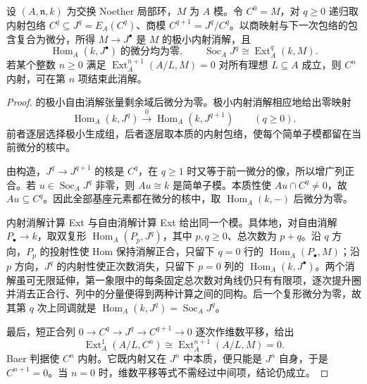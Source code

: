 \begin{lemma}\label{b3:lem:minimal-injective-resolution-socle}
	设 \((A,\mathfrak n,k)\) 为交换 Noether 局部环，\(M\) 为 \(A\) 模。令 \(C^0=M\)，对 \(q\ge0\) 递归取内射包络 \(C^q\subseteq J^q=E_A(C^q)\)、商模 \(C^{q+1}=J^q/C^q\)。以商映射与下一次包络的包含复合为微分，所得 \(M\to J^\bullet\) 是 \(M\) 的极小内射消解，且
	\[
		\operatorname{Hom}_A(k,J^\bullet)\;\text{的微分均为零}, \qquad \operatorname{Soc}_A J^q\cong\operatorname{Ext}_A^q(k,M).
	\]
	若某个整数 \(n\ge0\) 满足 \(\operatorname{Ext}_A^{n+1}(A/L,M)=0\) 对所有理想 \(L\subseteq A\) 成立，则 \(C^n\) 内射，可在第 \(n\) 项结束此消解。
\end{lemma}
\begin{proof}
	的极小自由消解张量剩余域后微分为零。极小内射消解相应地给出零映射
	\[
		\operatorname{Hom}_A(k,J^q)\xrightarrow{0} \operatorname{Hom}_A(k,J^{q+1})\qquad(q\ge0).
	\]
	前者逐层选择极小生成组，后者逐层取本质的内射包络，使每个简单子模都留在当前微分的核中。

	由构造，\(J^q\to J^{q+1}\) 的核是 \(C^q\)，在 \(q\ge1\) 时又等于前一微分的像，所以增广列正合。若 \(u\in\operatorname{Soc}_A J^q\) 非零，则 \(Au\cong k\) 是简单子模。本质性使 \(Au\cap C^q\ne0\)，故 \(Au\subseteq C^q\)。因此全部基座元素都在微分的核中，取 \(\operatorname{Hom}_A(k,-)\) 后微分为零。

	内射消解计算 Ext 与自由消解计算 Ext 给出同一个模。具体地，对自由消解 \(P_\bullet\to k\)，取双复形 \(\operatorname{Hom}_A(P_p,J^q)\)，其中 \(p,q\ge0\)、总次数为 \(p+q\)。沿 \(q\) 方向，\(P_p\) 的投射性使 Hom 保持消解正合，只留下 \(q=0\) 行的 \(\operatorname{Hom}_A(P_\bullet,M)\)；沿 \(p\) 方向，\(J^q\) 的内射性使正次数消失，只留下 \(p=0\) 列的 \(\operatorname{Hom}_A(k,J^\bullet)\)。两个消解虽可无限延伸，第一象限中的每条固定总次数对角线仍只有有限项，逐次提升圈并消去正合行、列中的分量便得到两种计算之间的同构。后一个复形微分为零，故其第 \(q\) 次上同调就是 \(\operatorname{Hom}_A(k,J^q)=\operatorname{Soc}_A J^q\)。

	最后，短正合列 \(0\to C^q\to J^q\to C^{q+1}\to0\) 逐次作维数平移，给出
	\[
		\operatorname{Ext}_A^1(A/L,C^n) \cong\operatorname{Ext}_A^{n+1}(A/L,M)=0.
	\]
	Baer 判据使 \(C^n\) 内射。它既内射又在 \(J^n\) 中本质，便只能是 \(J^n\) 自身，于是 \(C^{n+1}=0\)。当 \(n=0\) 时，维数平移等式不需经过中间项，结论仍成立。
\end{proof}

